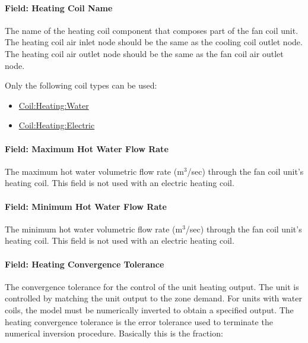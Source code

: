 \paragraph{Field: Heating Coil Name}\label{field-heating-coil-name-003}

The name of the heating coil component that composes part of the fan coil unit. The heating coil air inlet node should be the same as the cooling coil outlet node. The heating coil air outlet node should be the same as the fan coil air outlet node.

Only the following coil types can be used:

\begin{itemize}
\item
  \hyperref[coilheatingwater]{Coil:Heating:Water}
\item
  \hyperref[coilheatingelectric]{Coil:Heating:Electric}
\end{itemize}

\paragraph{Field: Maximum Hot Water Flow Rate}\label{field-maximum-hot-water-flow-rate-000}

The maximum hot water volumetric flow rate (m\(^{3}\)/sec) through the fan coil unit's heating coil. This field is not used with an electric heating coil.

\paragraph{Field: Minimum Hot Water Flow Rate}\label{field-minimum-hot-water-flow-rate-000}

The minimum hot water volumetric flow rate (m\(^{3}\)/sec) through the fan coil unit's heating coil. This field is not used with an electric heating coil.

\paragraph{Field: Heating Convergence Tolerance}\label{field-heating-convergence-tolerance-000}

The convergence tolerance for the control of the unit heating output. The unit is controlled by matching the unit output to the zone demand. For units with water coils, the model must be numerically inverted to obtain a specified output. The heating convergence tolerance is the error tolerance used to terminate the numerical inversion procedure. Basically this is the fraction:

